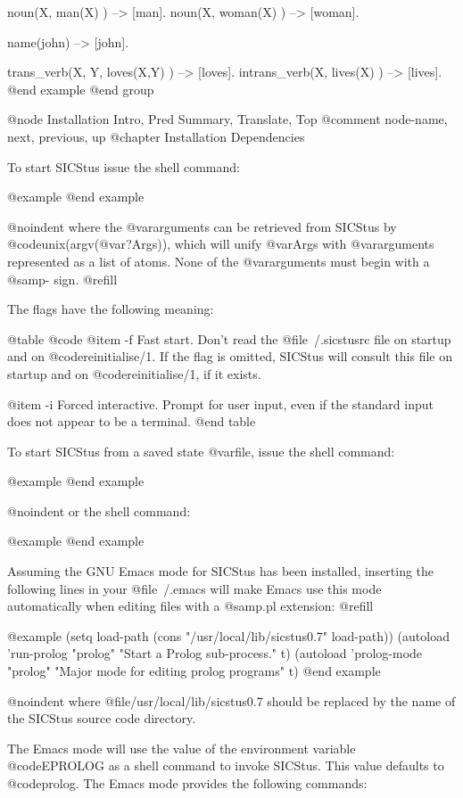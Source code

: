{{{{{noun(X, man(X) ) --> [man].
noun(X, woman(X) ) --> [woman].

name(john) --> [john].

trans_verb(X, Y, loves(X,Y) ) --> [loves].
intrans_verb(X, lives(X) ) --> [lives].
@end example
@end group

@node Installation Intro, Pred Summary, Translate, Top
@comment  node-name,  next,  previous,  up
@chapter Installation Dependencies

To start SICStus issue the shell command:

@example
@end example

@noindent
where the @var{arguments} can be retrieved from SICStus by
@code{unix(argv(@var{?Args}))}, which will unify @var{Args} with
@var{arguments} represented as a list of atoms.  None of the
@var{arguments} must begin with a @samp{-} sign. @refill

The flags have the following meaning:

@table @code
@item -f
Fast start.  Don't read the @file{~/.sicstusrc} file on startup and on
@code{reinitialise/1}.  If the flag is omitted, SICStus will consult
this file on startup and on @code{reinitialise/1}, if it exists.

@item -i
Forced interactive. Prompt for user input, even if the standard input
does not appear to be a terminal.
@end table

To start SICStus from a saved state @var{file}, issue the shell command:

@example
@end example

@noindent
or the shell command:

@example
@end example

Assuming the GNU Emacs mode for SICStus has been installed, inserting
the following lines in your @file{~/.emacs} will make Emacs use this
mode automatically when editing files with a @samp{.pl} extension: @refill

@example
(setq load-path (cons "/usr/local/lib/sicstus0.7" load-path))
(autoload 'run-prolog "prolog"
        	  "Start a Prolog sub-process." t)
(autoload 'prolog-mode "prolog"
	       	  "Major mode for editing prolog programs" t)
@end example

@noindent
where @file{/usr/local/lib/sicstus0.7} should be replaced by the name of
the SICStus source code directory.

The Emacs mode will use the value of the environment variable
@code{EPROLOG} as a shell command to invoke SICStus.  This value
defaults to @code{prolog}.  The Emacs mode provides the following
commands:

}}}}}
